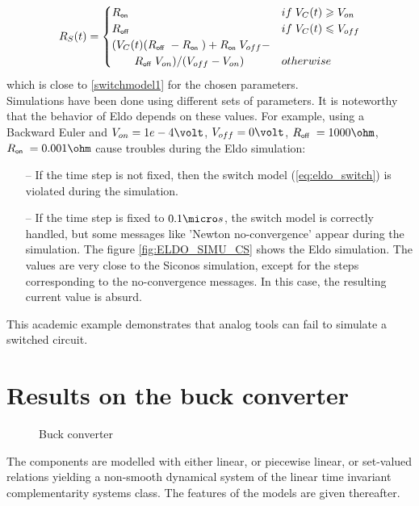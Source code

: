   \begin{equation}
    \label{eq:eldo_switch}
    R_S(t)=\begin{cases}R_\on\; & \mbox{if}\;V_{C}(t) \geq V_{on} \\   R_\off\;  & \mbox{if}\;V_{C}(t) \leq
    V_{off} \\ (V_{C}(t)(R_\off\;-R_\on\;)+ R_\on\; V_{off}- \\ \qquad
    R_\off\;V_{on})/(V_{off}-V_{on})& \mbox{otherwise}\; \end{cases}
  \end{equation}
  which is close to \eqref{switchmodel1} for the chosen parameters. \\Simulations have been done using
  different sets of parameters. It is noteworthy that the
behavior of {\sc Eldo} depends on these values. For example, using a Backward Euler and $V_{on}=1e-4
\volt$, $V_{off}=0 \volt$,
$R_\off\; = 1000 \ohm$, $R_\on\;=0.001\ohm$ cause troubles during the {\sc Eldo}
simulation:
\begin{enumerate}
\item [--] If the time step is not fixed, then the switch model (\ref{eq:eldo_switch}) is violated during the
  simulation.
  \item[--] If the time step is fixed to $0.1 \micro s$, the switch model is correctly handled, but
  some messages like 'Newton no-convergence' appear during the simulation. The figure \ref{fig:ELDO_SIMU_CS}
  shows the {\sc Eldo} simulation. The values are very close to the {\sc Siconos} simulation, except for the steps corresponding to the
  no-convergence messages. In this case, the resulting current value is absurd. 
\end{enumerate}


This academic example demonstrates that analog tools can fail to simulate a switched circuit.

\section{Results on the buck converter}
\label{section4}


\begin{figure}[!ht]
\centerline{
 \scalebox{1.0}{
    
 }
}
\caption{Buck converter}
\label{fig-Buck-converter}
\end{figure}
The components are modelled with either linear, or piecewise linear, or set-valued relations yielding a non-smooth dynamical system of the linear time invariant complementarity systems class. The features of the models are given thereafter.

